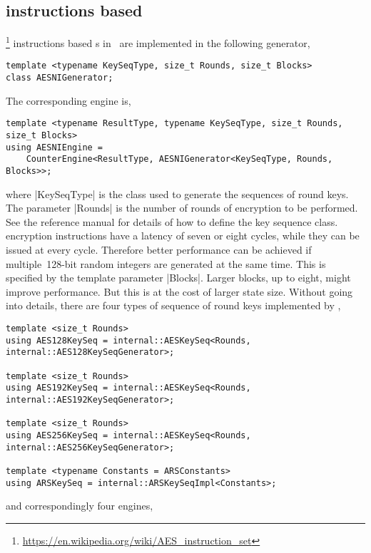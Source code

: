 \subsection{\texorpdfstring{\aesni}{AES-NI} instructions based
\texorpdfstring{\rng}{RNG}}
\label{sub:AES-NI instructions based RNG}

\aesni\footnote{\url{https://en.wikipedia.org/wiki/AES_instruction_set}}
instructions based \rng{}s in~\cite{Salmon:2011um} are implemented in the
following generator,
\begin{verbatim}
template <typename KeySeqType, size_t Rounds, size_t Blocks>
class AESNIGenerator;
\end{verbatim}
The corresponding \rng engine is,
\begin{verbatim}
template <typename ResultType, typename KeySeqType, size_t Rounds, size_t Blocks>
using AESNIEngine =
    CounterEngine<ResultType, AESNIGenerator<KeySeqType, Rounds, Blocks>>;
\end{verbatim}
where |KeySeqType| is the class used to generate the sequences of round keys.
The parameter |Rounds| is the number of rounds of \aes encryption to be
performed. See the reference manual for details of how to define the key
sequence class. \aesni encryption instructions have a latency of seven or eight
cycles, while they can be issued at every cycle. Therefore better performance
can be achieved if multiple~128-bit random integers are generated at the same
time. This is specified by the template parameter |Blocks|. Larger blocks, up
to eight, might improve performance. But this is at the cost of larger state
size. Without going into details, there are four types of sequence of round
keys implemented by \mckl,
\begin{verbatim}
template <size_t Rounds>
using AES128KeySeq = internal::AESKeySeq<Rounds, internal::AES128KeySeqGenerator>;

template <size_t Rounds>
using AES192KeySeq = internal::AESKeySeq<Rounds, internal::AES192KeySeqGenerator>;

template <size_t Rounds>
using AES256KeySeq = internal::AESKeySeq<Rounds, internal::AES256KeySeqGenerator>;

template <typename Constants = ARSConstants>
using ARSKeySeq = internal::ARSKeySeqImpl<Constants>;
\end{verbatim}
and correspondingly four \rng engines,
